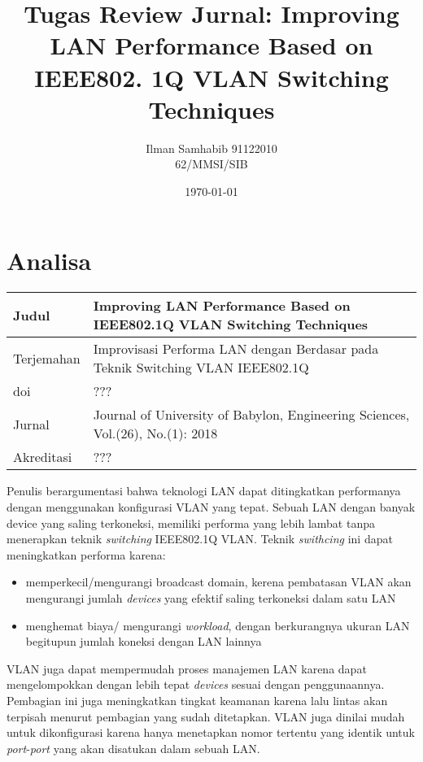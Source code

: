 \documentclass{article}
\title{Tugas Review Jurnal: Improving LAN Performance Based on IEEE802. 1Q VLAN Switching Techniques}
\author{Ilman Samhabib 91122010\\62/MMSI/SIB}
\date{\today}
\begin{document}
\maketitle
\section*{Analisa}
\begin{center}
    
    \begin{tabular}{|p{2cm}|p{12cm}|}
        \hline
        Judul & Improving LAN Performance Based on IEEE802.1Q VLAN Switching Techniques\cite{al2018improving}\\
        \hline
        Terjemahan & 
        Improvisasi Performa LAN dengan Berdasar pada Teknik Switching VLAN IEEE802.1Q\\
        \hline
        doi & ???\\    
        \hline
        Jurnal & Journal of University of Babylon, Engineering Sciences, Vol.(26), No.(1): 2018\\
        \hline
        Akreditasi & ???\\
        \hline
        
    \end{tabular}
\end{center}
\smallbreak
Penulis \cite{al2018improving} berargumentasi bahwa teknologi LAN dapat ditingkatkan performanya dengan 
menggunakan konfigurasi VLAN yang tepat. 
Sebuah LAN dengan banyak device 
yang saling terkoneksi, 
memiliki performa yang lebih lambat 
tanpa menerapkan teknik \emph{switching} 
IEEE802.1Q VLAN. 
Teknik \emph{swithcing} ini dapat meningkatkan performa karena:
\begin{itemize}
    \item memperkecil/mengurangi broadcast domain, kerena pembatasan VLAN akan mengurangi jumlah \emph{devices} yang efektif saling terkoneksi dalam satu LAN
    \item menghemat biaya/ mengurangi \emph{workload}, dengan berkurangnya ukuran LAN begitupun jumlah koneksi dengan LAN lainnya      
\end{itemize}
VLAN juga dapat mempermudah proses 
manajemen LAN karena dapat mengelompokkan 
dengan lebih tepat \emph{devices} sesuai 
dengan penggunaannya. Pembagian ini juga meningkatkan tingkat keamanan karena lalu lintas akan terpisah menurut pembagian yang sudah ditetapkan.
VLAN juga dinilai mudah untuk dikonfigurasi karena 
hanya menetapkan nomor tertentu yang identik untuk \emph{port}-\emph{port} yang akan disatukan dalam sebuah LAN.
\end{document}
